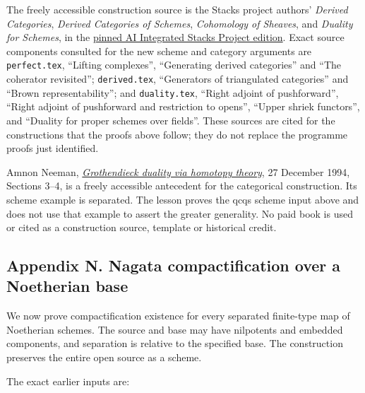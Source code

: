 \documentclass[11pt]{article}
\begin{document}
The freely accessible construction source is the Stacks project authors'
\emph{Derived Categories}, \emph{Derived Categories of Schemes},
\emph{Cohomology of Sheaves}, and \emph{Duality for Schemes}, in the
\href{https://github.com/KokunoYumeto/unofficial-stacks-project-ai-drafts/tree/565b10e987aba5969b21145a0833f42d69f96790}{pinned
AI Integrated Stacks Project edition}. Exact source components consulted
for the new scheme and category arguments are \texttt{perfect.tex},
``Lifting complexes'', ``Generating derived categories'' and ``The
coherator revisited''; \texttt{derived.tex}, ``Generators of
triangulated categories'' and ``Brown representability''; and
\texttt{duality.tex}, ``Right adjoint of pushforward'', ``Right adjoint
of pushforward and restriction to opens'', ``Upper shriek functors'',
and ``Duality for proper schemes over fields''. These sources are cited
for the constructions that the proofs above follow; they do not replace
the programme proofs just identified.

Amnon Neeman,
\href{https://arxiv.org/abs/alg-geom/9412022v1}{\emph{Grothendieck
duality via homotopy theory}}, 27 December 1994, Sections 3--4, is a
freely accessible antecedent for the categorical construction. Its
scheme example is separated. The lesson proves the qcqs scheme input
above and does not use that example to assert the greater generality. No
paid book is used or cited as a construction source, template or
historical credit.

\subsection{Appendix N. Nagata compactification over a Noetherian
base}\label{appendix-n.-nagata-compactification-over-a-noetherian-base}

We now prove compactification existence for every separated finite-type
map of Noetherian schemes. The source and base may have nilpotents and
embedded components, and separation is relative to the specified base.
The construction preserves the entire open source as a scheme.

The exact earlier inputs are:
\end{document}
